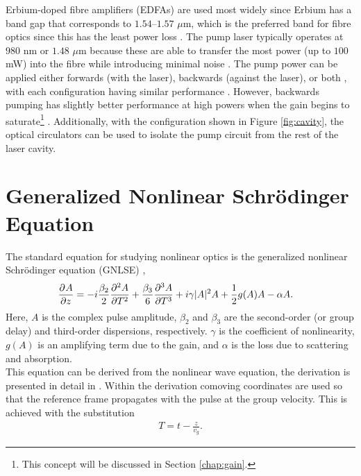 Erbium-doped fibre amplifiers (EDFAs) are used most widely since Erbium has a band gap that corresponds to $1.54$--$1.57$ $\mu$m, which is the preferred band for fibre optics since this has the least power loss \cite{agrawal2002, alazzawi, starodoumov}. The pump laser typically operates at $980$ nm or $1.48$ $\mu$m because these are able to transfer the most power (up to $100$ mW) into the fibre while introducing minimal noise \cite{agrawal2002, alazzawi, becker, starodoumov}. The pump power can be applied either forwards (with the laser), backwards (against the laser), or both \cite{alazzawi}, with each configuration having similar performance \cite{agrawal2002}. However, backwards pumping has slightly better performance at high powers when the gain begins to saturate\footnote{This concept will be discussed in Section \ref{chap:gain}.} \cite{agrawal2002}. Additionally, with the configuration shown in Figure \ref{fig:cavity}, the optical circulators can be used to isolate the pump circuit from the rest of the laser cavity. \\

\section{Generalized Nonlinear Schr\"odinger Equation}
The standard equation for studying nonlinear optics is the generalized nonlinear Schr\"odinger equation (GNLSE) \cite{agrawal2013, burgoyne2007, ferreira, peng, shtyrina, yarutkina},
\begin{align}
\label{eq:nlse}
\pdiff{A}{z} &= - i \frac{\beta_2}{2}\pdiff[2]{A}{T} + \frac{\beta_3}{6}\pdiff[3]{A}{T} + i \gamma |A|^2 A + \frac{1}{2}g(A) A - \alpha A.
\end{align}
Here, $A$ is the complex pulse amplitude, $\beta_2$ and $\beta_3$ are the second-order (or group delay) and third-order dispersions, respectively. $\gamma$ is the coefficient of nonlinearity, $g(A)$ is an amplifying term due to the gain, and $\alpha$ is the loss due to scattering and absorption. \\

This equation can be derived from the nonlinear wave equation, the derivation is presented in detail in \cite{agrawal2013, ferreira}. Within the derivation comoving coordinates are used so that the reference frame propagates with the pulse at the group velocity. This is achieved with the substitution
\begin{align*}
T = t - \frac{z}{v_g}.
\end{align*}


